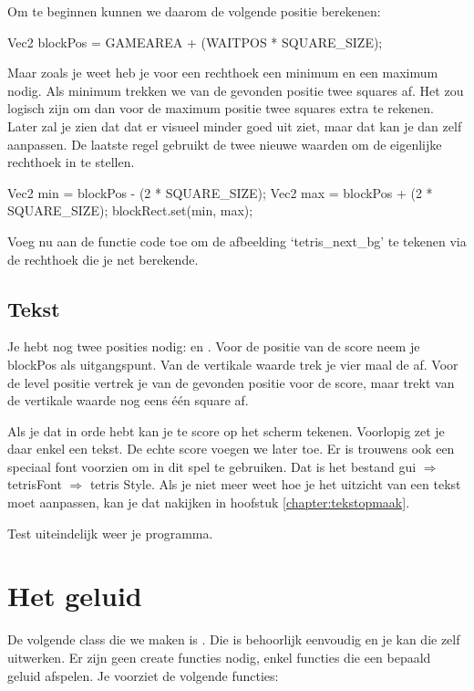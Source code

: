 Om te beginnen kunnen we daarom de volgende positie berekenen:

\begin{code}
Vec2 blockPos = GAMEAREA + (WAITPOS * SQUARE_SIZE);
\end{code}

Maar zoals je weet heb je voor een rechthoek een minimum en een maximum nodig. Als minimum trekken we van de gevonden positie twee squares af. Het zou logisch zijn om dan voor de maximum positie twee squares extra te rekenen. Later zal je zien dat dat er visueel minder goed uit ziet, maar dat kan je dan zelf aanpassen. De laatste regel gebruikt de twee nieuwe waarden om de eigenlijke rechthoek in te stellen.

\begin{code}
Vec2 min = blockPos - (2 * SQUARE_SIZE);
Vec2 max = blockPos + (2 * SQUARE_SIZE);
blockRect.set(min, max);
\end{code}

Voeg nu aan de functie  code toe om de afbeelding `tetris\_next\_bg' te tekenen via de rechthoek die je net berekende.

\subsection{Tekst}
Je hebt nog twee posities nodig:  en . Voor de positie van de score neem je blockPos als uitgangspunt. Van de vertikale waarde trek je vier maal de  af. Voor de level positie vertrek je van de gevonden positie voor de score, maar trekt van de vertikale waarde nog eens \'e\'en square af.

Als je dat in orde hebt kan je te score op het scherm tekenen. Voorlopig zet je daar enkel een tekst. De echte score voegen we later toe. Er is trouwens ook een speciaal font voorzien om in dit spel te gebruiken. Dat is het bestand gui $\Rightarrow$ tetrisFont $\Rightarrow$ tetris Style. Als je niet meer weet hoe je het uitzicht van een tekst moet aanpassen, kan je dat nakijken in hoofstuk \ref{chapter:tekstopmaak}.

Test uiteindelijk weer je programma.

\section{Het geluid}
De volgende class die we maken is . Die is behoorlijk eenvoudig en je kan die zelf uitwerken. Er zijn geen create functies nodig, enkel functies die een bepaald geluid afspelen. Je voorziet de volgende functies:


